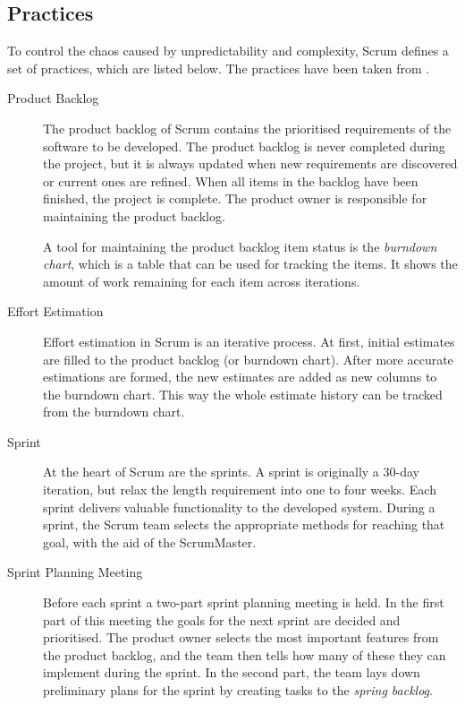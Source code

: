 \subsection{Practices}
\label{toc:agile:scrum:practices}

To control the chaos caused by unpredictability and complexity, Scrum 
defines a set of practices, which are listed below. The practices have 
been taken from \citep{agilesdm,apmscrum,scrumprocess}.

\begin{description}

\item[Product Backlog] The product backlog of Scrum contains the 
prioritised requirements of the software to be developed. The product 
backlog is never completed during the project, but it is always 
updated when new requirements are discovered or current ones are 
refined. When all items in the backlog have been finished, the project 
is complete. The product owner is responsible for maintaining the 
product backlog.

A tool for maintaining the product backlog item status is the 
\textsl{burndown chart}, which is a table that can be used for 
tracking the items. It shows the amount of work remaining for each 
item across iterations.

\item[Effort Estimation] Effort estimation in Scrum is an iterative 
process. At first, initial estimates are filled to the product backlog 
(or burndown chart). After more accurate estimations are formed, the
new estimates are added as new columns to the burndown chart. This way
the whole estimate history can be tracked from the burndown chart.

\item[Sprint] At the heart of Scrum are the sprints. A sprint is 
originally a 30-day iteration, but \cite{scrumprocess} relax the 
length requirement into one to four weeks. Each sprint delivers 
valuable functionality to the developed system. During a sprint, the 
Scrum team selects the appropriate methods for reaching that goal, 
with the aid of the ScrumMaster.

\item[Sprint Planning Meeting] Before each sprint a two-part sprint 
planning meeting is held. In the first part of this meeting the goals 
for the next sprint are decided and prioritised. The product owner 
selects the most important features from the product backlog, and the 
team then tells how many of these they can implement during the 
sprint. In the second part, the team lays down preliminary plans for 
the sprint by creating tasks to the \textsl{spring backlog}.


\end{description}
